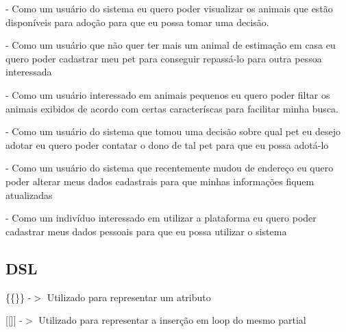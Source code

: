 \begin{DoxyVerb}- Como um usuário do sistema eu quero poder visualizar os animais que
estão disponíveis para adoção para que eu possa tomar uma decisão.

- Como um usuário que não quer ter mais um animal de estimação em casa
eu quero poder cadastrar meu pet para conseguir repassá-lo para outra pessoa interessada

- Como um usuário interessado em animais pequenos eu quero poder filtar
os animais exibidos de acordo com certas caracteríscas para facilitar minha busca.

- Como um usuário do sistema que tomou uma decisão sobre qual pet eu desejo adotar eu quero 
poder contatar o dono de tal pet para que eu possa adotá-lo

- Como um usuário do sistema que recentemente mudou de endereço eu quero poder
alterar meus dados cadastrais para que minhas informações fiquem atualizadas

- Como um indivíduo interessado em utilizar a plataforma eu quero poder
cadastrar meus dados pessoais para que eu possa utilizar o sistema
\end{DoxyVerb}


\subsection*{D\+SL}


\begin{DoxyItemize}
\item \{\{\}\} -\/$>$ Utilizado para representar um atributo
\item \mbox{[}\mbox{[}\mbox{]}\mbox{]} -\/$>$ Utilizado para representar a inserção em loop do mesmo partial 
\end{DoxyItemize}